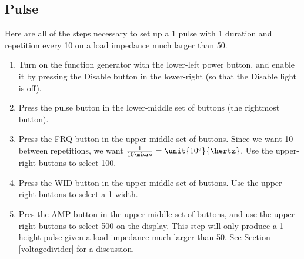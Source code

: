 \documentclass{article}
\begin{document}
\subsection{Pulse}
Here are all of the steps necessary to set up a \unit{1}{\volt} pulse with \unit{1}{\micro\second} duration and repetition every \unit{10}{\micro\second} on a load impedance much larger than \unit{50}{\ohm}.
\begin{enumerate}
\item Turn on the function generator with the lower-left power button, and enable it by pressing the Disable button in the lower-right (so that the Disable light is off).
\item Press the pulse button in the lower-middle set of buttons (the rightmost button).
\item Press the FRQ button in the upper-middle set of buttons. Since we want \unit{10}{\micro\second} between repetitions, we want $\frac{1}{10\micro} = \unit{10^5}{\hertz}$. Use the upper-right buttons to select \unit{100}{\kilo\hertz}.
\item Press the WID button in the upper-middle set of buttons. Use the upper-right buttons to select a \unit{1}{\micro\second} width.
\item Pres the AMP button in the upper-middle set of buttons, and use the upper-right buttons to select \unit{500}{\milli\volt} on the display. This step will only produce a \unit{1}{\volt} height pulse given a load impedance much larger than \unit{50}{\ohm}. See Section \ref{voltagedivider} for a discussion.
\end{enumerate}
\end{document}
